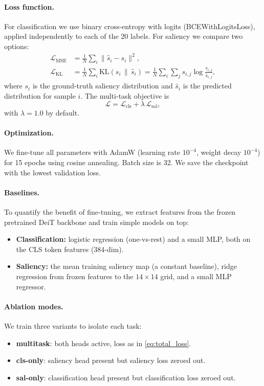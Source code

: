 \documentclass{article}
\begin{document}
\paragraph{Loss function.}
For classification we use binary cross-entropy with logits (BCEWithLogitsLoss), applied independently to each of the 20 labels. For saliency we compare two options:
\begin{align}
\mathcal{L}_{\text{MSE}} &= \frac{1}{N}\sum_{i}\|\hat{s}_i - s_i\|^2, \label{eq:mse}\\
\mathcal{L}_{\text{KL}} &= \frac{1}{N}\sum_{i}\mathrm{KL}(s_i \,\|\, \hat{s}_i) = \frac{1}{N}\sum_{i}\sum_{j}s_{i,j}\log\frac{s_{i,j}}{\hat{s}_{i,j}}, \label{eq:kl}
\end{align}
where $s_i$ is the ground-truth saliency distribution and $\hat{s}_i$ is the predicted distribution for sample $i$. The multi-task objective is
\begin{equation}
\mathcal{L} = \mathcal{L}_{\text{cls}} + \lambda\,\mathcal{L}_{\text{sal}},
\label{eq:total_loss}
\end{equation}
with $\lambda = 1.0$ by default.

\paragraph{Optimization.}
We fine-tune all parameters with AdamW (learning rate $10^{-4}$, weight decay $10^{-4}$) for 15 epochs using cosine annealing. Batch size is 32. We save the checkpoint with the lowest validation loss.

\paragraph{Baselines.}
To quantify the benefit of fine-tuning, we extract features from the frozen pretrained DeiT backbone and train simple models on top:
\begin{itemize}
    \item \textbf{Classification:} logistic regression (one-vs-rest) and a small MLP, both on the CLS token features (384-dim).
    \item \textbf{Saliency:} the mean training saliency map (a constant baseline), ridge regression from frozen features to the $14\!\times\!14$ grid, and a small MLP regressor.
\end{itemize}

\paragraph{Ablation modes.}
We train three variants to isolate each task:
\begin{itemize}
    \item \textbf{multitask}: both heads active, loss as in \eqref{eq:total_loss}.
    \item \textbf{cls-only}: saliency head present but saliency loss zeroed out.
    \item \textbf{sal-only}: classification head present but classification loss zeroed out.
\end{itemize}
\end{document}
